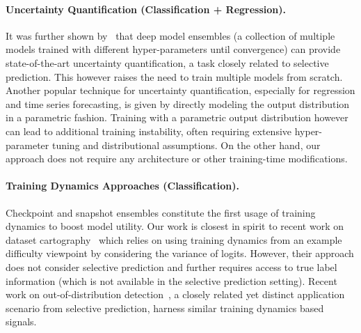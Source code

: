 \paragraph{Uncertainty Quantification (Classification + Regression).} 
It was further shown by~\citep{balaji2017uncertainty, zaoui2020regression} that deep model ensembles (\ie a collection of multiple models trained with different hyper-parameters until convergence) can provide state-of-the-art uncertainty quantification, a task closely related to selective prediction. This however raises the need to train multiple models from scratch.  Another popular technique for uncertainty quantification, especially for regression and time series forecasting, is given by directly modeling the output distribution~\citep{alexandrov2019gluonts} in a parametric fashion. Training with a parametric output distribution however can lead to additional training instability, often requiring extensive hyper-parameter tuning and distributional assumptions. On the other hand, our approach does not require any architecture or other training-time modifications. 


\paragraph{Training Dynamics Approaches (Classification).} Checkpoint and snapshot ensembles \citep{huang2017snapshot, chen2017checkpoint} constitute the first usage of training dynamics to boost model utility. Our work is closest in spirit to recent work on dataset cartography~\citep{swayamdipta2020dataset} which relies on using training dynamics from an example difficulty viewpoint by considering the variance of logits. However, their approach does not consider selective prediction and further requires access to true label information (which is not available in the selective prediction setting). Recent work on out-of-distribution detection~\citep{adila2022understanding}, a closely related yet distinct application scenario from selective prediction, harness similar training dynamics based signals.


